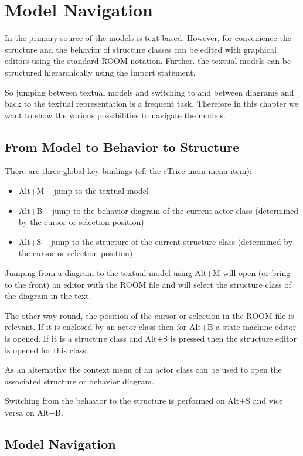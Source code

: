 \section{Model Navigation}

In \eTrice{} the primary source of the models is text based. However, for convenience the structure and the behavior of
structure classes can be edited with graphical editors using the standard ROOM notation.
Further. the textual models can be structured hierarchically using the import statement.

So jumping between textual models and switching to and between diagrams and back to the textual representation
is a frequent task. Therefore in this chapter we want to show the various possibilities to navigate the models.

\subsection{From Model to Behavior to Structure}

There are three global key bindings (cf. the eTrice main menu item):

\begin{itemize}
\item Alt+M -- jump to the textual model
\item Alt+B -- jump to the behavior diagram of the current actor class (determined by the cursor or selection position)
\item Alt+S -- jump to the structure of the current structure class (determined by the cursor or selection position)
\end{itemize}

Jumping from a diagram to the textual model using Alt+M will open (or bring to the front) an editor with the ROOM file
and will select the structure class of the diagram in the text.

The other way round, the position of the cursor or selection in the ROOM file is relevant. If it is enclosed by
an actor class then for Alt+B a state machine editor is opened. If it is a structure class and Alt+S is pressed then
the structure editor is opened for this class.

As an alternative the context menu of an actor class can be used to open the associated structure or behavior diagram.

Switching from the behavior to the structure is performed on Alt+S and vice versa on Alt+B.

\subsection{Model Navigation}

